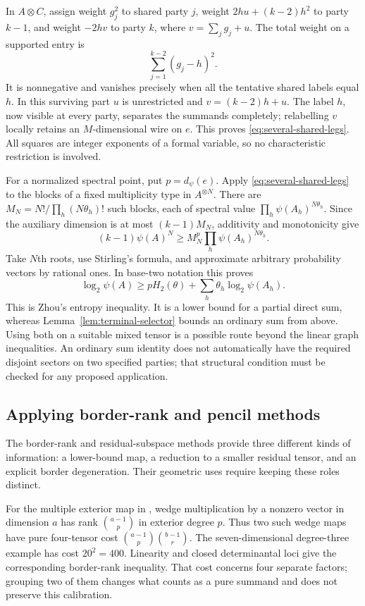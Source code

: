 In $A\otimes C$, assign weight $g_j^2$ to shared party $j$, weight $2hu+(k-2)h^2$ to party $k-1$, and weight $-2hv$ to party $k$, where $v=\sum_jg_j+u$. The total weight on a supported entry is
\[
 \sum_{j=1}^{k-2}(g_j-h)^2.
\]
It is nonnegative and vanishes precisely when all the tentative shared labels equal $h$. In this surviving part $u$ is unrestricted and $v=(k-2)h+u$. The label $h$, now visible at every party, separates the summands completely; relabelling $v$ locally retains an $M$-dimensional wire on $e$. This proves \eqref{eq:several-shared-legs}. All squares are integer exponents of a formal variable, so no characteristic restriction is involved.

For a normalized spectral point, put $p=d_\psi(e)$. Apply \eqref{eq:several-shared-legs} to the blocks of a fixed multiplicity type in $A^{\otimes N}$. There are $M_N=N!/\prod_h(N\theta_h)!$ such blocks, each of spectral value $\prod_h\psi(A_h)^{N\theta_h}$. Since the auxiliary dimension is at most $(k-1)M_N$, additivity and monotonicity give
\[
 (k-1)\psi(A)^N\geq
 M_N^{p}\prod_h\psi(A_h)^{N\theta_h}.
\]
Take $N$th roots, use Stirling's formula, and approximate arbitrary probability vectors by rational ones. In base-two notation this proves
\begin{equation}\label{eq:shared-entropy}
 \log_2\psi(A)\geq pH_2(\theta)+
                  \sum_h\theta_h\log_2\psi(A_h).
\end{equation}
This is Zhou's entropy inequality. It is a lower bound for a partial direct sum, whereas Lemma~\ref{lem:terminal-selector} bounds an ordinary sum from above. Using both on a suitable mixed tensor is a possible route beyond the linear graph inequalities. An ordinary sum identity does not automatically have the required disjoint sectors on two specified parties; that structural condition must be checked for any proposed application.

\subsection{Applying border-rank and pencil methods}\label{sec:border-pencil-tests}
The border-rank and residual-subspace methods provide three different kinds of information: a lower-bound map, a reduction to a smaller residual tensor, and an explicit border degeneration. Their geometric uses require keeping these roles distinct.

For the multiple exterior map in \cite[sections ``The multiple exterior map for the bound fifty-two'' and ``The exterior map used for the uniform bound'']{SuppliedBorder2026}, wedge multiplication by a nonzero vector in dimension $a$ has rank $\binom{a-1}{p}$ in exterior degree $p$. Thus two such wedge maps have pure four-tensor cost $\binom{a-1}{p}\binom{b-1}{r}$. The seven-dimensional degree-three example has cost $20^2=400$. Linearity and closed determinantal loci give the corresponding border-rank inequality. That cost concerns four separate factors; grouping two of them changes what counts as a pure summand and does not preserve this calibration.

